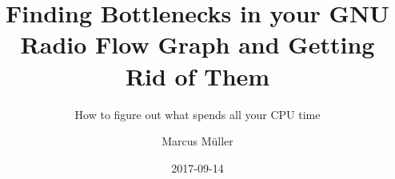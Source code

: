 %
\date{2017-09-14}
\title[Profiling GNU\,Radio]{Finding Bottlenecks in your GNU Radio Flow Graph
and Getting Rid of Them}
\subtitle{How to figure out what spends all your CPU time}
\author{Marcus Müller}

\newcommand{\GR}{{GNU\,Radio}\xspace}